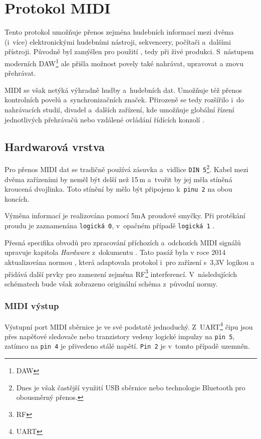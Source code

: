 \chapter{Protokol MIDI}\label{chpt:MIDI}

Tento protokol umožňuje přenos zejména hudebních informací mezi dvěma (i~více) elektronickými hudebními nástroji, sekvencery, počítači a~dalšími přístroji. Původně byl zamýšlen pro použití , tedy při živé produkci. \cite{MIDIspecs} S~nástupem moderních \acs{DAW}\footnote{\acl{DAW}} ale přišla možnost povely také nahrávat, upravovat a znovu přehrávat. 

\acs{MIDI} se však netýká výhradně hudby a~hudebních dat. Umožňuje též přenos kontrolních povelů a~synchronizačních značek. Přirozeně se tedy rozšířilo i~do nahrávacích studií, divadel a~dalších zařízení, kde umožňuje globální řízení jednotlivých přehrávačů nebo vzdálené ovládání řídících konzolí \cite{vkMIDI}.

\section{Hardwarová vrstva}
Pro přenos \acs{MIDI} dat se tradičně používá zásuvka a~vidlice \texttt{DIN~5}\footnote{Dnes je však častější využití USB sběrnice nebo technologie Bluetooth pro obousměrný přenos.}.  Kabel mezi dvěma zařízeními by neměl být delší než 15\,\unit{m} a~tvořit by jej měla stíněná kroucená dvojlinka. Toto stínění by mělo být připojeno k~\texttt{pinu~2} na obou koncích. 

Výměna informací je realizována pomocí 5\unit{mA} proudové smyčky. Při protékání proudu je zaznamenána \texttt{logická~0}, v~opačném případě \texttt{logická~1} \cite{MIDIspecs}.

Přesná specifika obvodů pro zpracování příchozích a~odchozích \acs{MIDI} signálů upravuje kapitola \emph{Hardware} z~dokumentu \cite{MIDIspecs}. Tato pasáž byla v roce 2014 aktualizována normou \cite{MIDIupd}, která adaptovala protokol i~pro zařízení s~3,3\unit{V} logikou a přidává další prvky pro zamezení zejména \acs{RF}\footnote{\acl{RF}} interferencí. V~následujících schématech bude však zobrazeno originální schéma z~původní normy.

\subsection{MIDI výstup}

Výstupní port \acs{MIDI} sběrnice je ve své podstatě jednoduchý. Z~\acs{UART}\footnote{\acl{UART}} čipu jsou přes napěťové sledovače nebo tranzistory vedeny logické impulzy na \texttt{pin~5}, zatímco na \texttt{pin~4} je přivedeno stálé napětí. \texttt{Pin~2} je v~tomto případě uzemněn. \cite{MIDIspecs}

